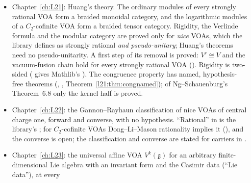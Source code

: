 \begin{description}
\begin{itemize}
    character is proved as stated. Classical freeness, the paper's Theorem~1.1, is one Lean theorem,
     (Theorem~\ref{l20:thm:ad11}): the presented algebra
    $\C[e,h,f]/(eQ^m,hQ^m,fQ^m)$ is isomorphic to the $C_2$-algebra $R_V$, and its arc algebra maps
    isomorphically onto Li's associated graded. Since the library has no functor $J_\infty$, the arc
    algebra $J_\infty R_V$ is realized as the jet algebra of the presented algebra, with its universal
    property. Its Virasoro
    companion (Section~\ref{l20:sec:vir}) proves, for every $m\ge0$ and with no hypothesis, that the
    minimal model $L(c_{2,2m+3},0)$ is classically free, with $R_L\cong\C[T]/(T^{m+1})$. A further
    section (Section~\ref{l20:sec:p3}) describes finite commutative-algebra files that prove no theorem
    about a VOA and are kept because Chapter~\ref{ch:L24} reuses them.
  \item Chapter~\ref{ch:L21}: Huang's theory. The ordinary modules of every strongly rational VOA form a
    braided monoidal category, and the logarithmic modules of a $C_2$-cofinite VOA form a braided tensor
    category. Rigidity, the Verlinde formula and the modular category are proved only for \emph{nice}
    VOAs, which the library defines as strongly rational \emph{and pseudo-unitary}; Huang's theorems need
    no pseudo-unitarity. A first step of its removal is proved: $V'\cong V$ and the vacuum-fusion chain hold for every
    strongly rational VOA (). Rigidity is two-sided ( gives
    Mathlib's ). The congruence property has named, hypothesis-free theorems
    (, , Theorem~\ref{l21:thm:congnamed});
    of Ng--Schauenburg's Theorem~6.8 only the kernel half is proved.
  \item Chapter~\ref{ch:L22}: the Gannon--Rayhaun classification of nice VOAs of central charge one,
    forward and converse, with no hypothesis. ``Rational'' in  is the library's
    ; for $C_2$-cofinite VOAs Dong--Li--Mason rationality implies it
    (), and the converse is open;
    the classification and converse are stated for carriers in .
  \item Chapter~\ref{ch:L23}: the universal affine VOA $V^k(\mathfrak g)$ for an arbitrary
    finite-dimensional Lie algebra with an invariant form and the Casimir data (``Lie data''), at every

\end{itemize}
\end{description}
